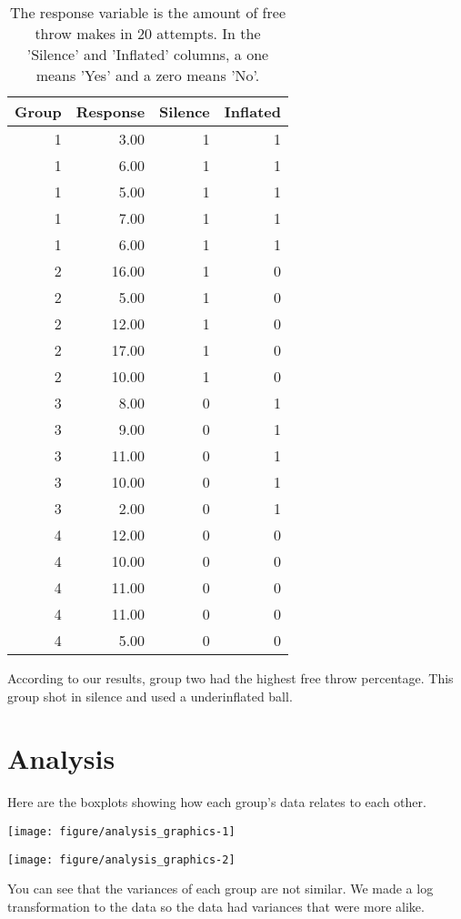 \documentclass[12pt]{article}\usepackage[]{graphicx}\usepackage[]{color}
\makeatletter
\def\maxwidth{ %
  \ifdim\Gin@nat@width>\linewidth
    \linewidth
  \else
    \Gin@nat@width
  \fi
}
\newenvironment{knitrout}{}{} %
\makeatother
\begin{document}
\begin{table}[ht]
\centering
\begin{tabular}{rrrr}
  \hline
Group & Response & Silence & Inflated \\ 
  \hline
  1 & 3.00 &   1 &   1 \\ 
    1 & 6.00 &   1 &   1 \\ 
    1 & 5.00 &   1 &   1 \\ 
    1 & 7.00 &   1 &   1 \\ 
    1 & 6.00 &   1 &   1 \\ 
    2 & 16.00 &   1 &   0 \\ 
    2 & 5.00 &   1 &   0 \\ 
    2 & 12.00 &   1 &   0 \\ 
    2 & 17.00 &   1 &   0 \\ 
    2 & 10.00 &   1 &   0 \\ 
    3 & 8.00 &   0 &   1 \\ 
    3 & 9.00 &   0 &   1 \\ 
    3 & 11.00 &   0 &   1 \\ 
    3 & 10.00 &   0 &   1 \\ 
    3 & 2.00 &   0 &   1 \\ 
    4 & 12.00 &   0 &   0 \\ 
    4 & 10.00 &   0 &   0 \\ 
    4 & 11.00 &   0 &   0 \\ 
    4 & 11.00 &   0 &   0 \\ 
    4 & 5.00 &   0 &   0 \\ 
   \hline
\end{tabular}
\caption{The response variable is the amount of free throw makes in 20 attempts. In the 'Silence' and 'Inflated' columns, a one means 'Yes' and a zero means 'No'.} 
\label{tab:ldsl}
\end{table}

According to our results, group two had the highest free throw percentage. This group shot in silence and used a underinflated ball. 

\section{Analysis}

Here are the boxplots showing how each group's data relates to each other. 


\begin{knitrout}
\color{fgcolor}
\texttt{[image: figure/analysis\_graphics-1]} 

\texttt{[image: figure/analysis\_graphics-2]} 

\end{knitrout}
You can see that the variances of each group are not similar. We made a log transformation to the data so the data had variances that were more alike. 
\end{document}
